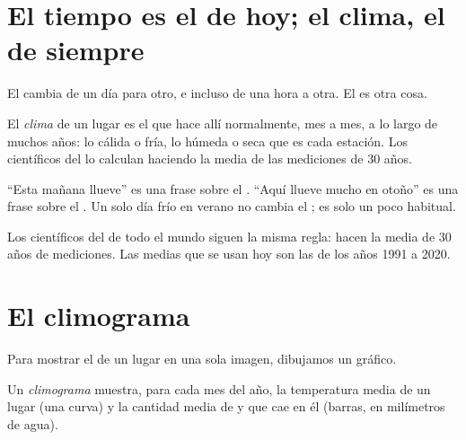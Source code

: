 \section{El tiempo es el de hoy; el clima, el de siempre}

El  cambia de un día para otro, e incluso de una hora a otra. El
 es otra cosa.

\begin{definition}[Clima]\label{def:g5:weather-and-climate:climate}
El \emph{clima} de un lugar es el  que hace allí
normalmente, mes a mes, a lo largo de muchos años: lo cálida o fría, lo
húmeda o seca que es cada estación. Los científicos del  lo calculan
haciendo la media de las mediciones de 30 años.
\end{definition}

``Esta mañana llueve'' es una frase sobre el . ``Aquí llueve mucho en
otoño'' es una frase sobre el . Un solo día frío en verano no cambia
el ; es solo un  poco habitual.

Los científicos del  de todo el mundo siguen la misma regla: hacen la
media de 30 años de mediciones. Las medias que se usan hoy son las de los
años 1991 a 2020.

\section{El climograma}

Para mostrar el  de un lugar en una sola imagen, dibujamos un gráfico.

\begin{definition}[Climograma]\label{def:g5:weather-and-climate:climate-chart}
Un \emph{climograma} muestra, para cada mes del año, la
temperatura media de un lugar (una curva) y la cantidad media de  y
 que cae en él (barras, en milímetros de agua).
\end{definition}

